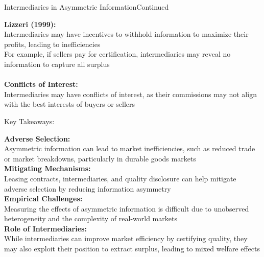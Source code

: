 \documentclass[aspectratio=169]{beamer}  %
\begin{document}
 \begin{frame}{Intermediaries in Asymmetric Information}{Continued}
\begin{spacing}{1.5}
 
{\small
\textbf{Lizzeri (1999):}\\
Intermediaries may have incentives to withhold information to maximize their profits, leading to inefficiencies\\
For example, if sellers pay for certification, intermediaries may reveal no information to capture all surplus\\
\quad \\
\textbf{Conflicts of Interest:} \\Intermediaries   may have conflicts of interest, as their commissions may not align with the best interests of buyers or sellers
}
\end{spacing}
\end{frame}


\begin{frame}{Key Takeaways:}{}
\begin{spacing}{1.5}
{\small
\textbf{Adverse Selection:}\\ Asymmetric information can lead to market inefficiencies, such as reduced trade or market breakdowns, particularly in durable goods markets\\
\textbf{Mitigating Mechanisms:}\\ Leasing contracts, intermediaries, and quality disclosure can help mitigate adverse selection by reducing information asymmetry\\
\textbf{Empirical Challenges:}\\ Measuring the effects of asymmetric information is difficult due to unobserved heterogeneity and the complexity of real-world markets\\
\textbf{Role of Intermediaries:}\\ While intermediaries can improve market efficiency by certifying quality, they may also exploit their position to extract surplus, leading to mixed welfare effects

    }
\end{spacing}
\end{frame}
\end{document}
